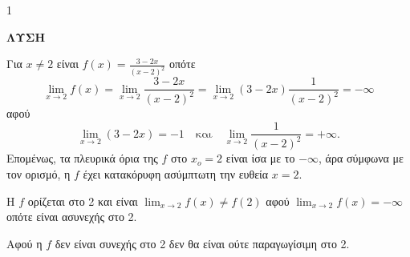\begin{ylh}{1}
    \item [Ύλη από εικόνα]
\end{ylh}
\textbf{ΛΥΣΗ}
\begin{alist}
\item Για $x \neq 2$ είναι $f(x) = \frac{3-2x}{(x-2)^2}$ οπότε
\[
\lim_{x\to 2} f(x) = \lim_{x\to 2} \frac{3-2x}{(x-2)^2} = \lim_{x\to 2}(3-2x) \frac{1}{(x-2)^2} = -\infty
\]
αφού
\[
\lim_{x\to 2}(3-2x) = -1 \quad \text{και} \quad \lim_{x\to 2} \frac{1}{(x-2)^2} = +\infty.
\]
Επομένως, τα πλευρικά όρια της $f$ στο $x_o = 2$ είναι ίσα με το $-\infty$, άρα σύμφωνα με τον ορισμό, η $f$ έχει κατακόρυφη ασύμπτωτη την ευθεία $x=2$.

\item
\begin{rlist}
\item Η $f$ ορίζεται στο 2 και είναι $\lim_{x\to 2} f(x) \neq f(2)$ αφού $\lim_{x\to 2} f(x) = -\infty$ οπότε είναι ασυνεχής στο 2.
\item Αφού η $f$ δεν είναι συνεχής στο 2 δεν θα είναι ούτε παραγωγίσιμη στο 2.
\end{rlist}
\end{alist}